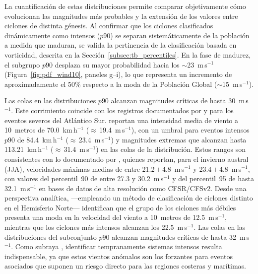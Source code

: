 La cuantificación de estas distribuciones permite comparar objetivamente cómo evolucionan las magnitudes más probables y la extensión de los valores entre ciclones de distinta génesis. 
Al confirmar que los ciclones clasificados dinámicamente como intensos ($p90$) se separan sistemáticamente de la población a medida que maduran, se valida la pertinencia de la clasificación basada en vorticidad, descrita en la Sección~\ref{subsec:tb_percentiles}. 
En la fase de madurez, el subgrupo $p90$ desplaza su mayor probabilidad hacia los $\sim$23~m\,s$^{-1}$ (Figura~\ref{fig:pdf_wind10}, paneles g--i), lo que representa un incremento de aproximadamente el 50\% respecto a la moda de la Población Global ($\sim$15~m\,s$^{-1}$).

Las colas en las distribuciones $p90$ alcanzan magnitudes críticas de hasta 30~m\,s$^{-1}$. Este corrimiento coincide con los registros documentados por \citet{padilhareinke2026characterization} y \citet{gramcianinov2020analysis} para los eventos severos del Atlántico Sur. 
\citet{padilhareinke2026characterization} reportan una intensidad media de viento a 10~metros de 70.0~km\,h$^{-1}$ (${\approx}$\,19.4~m\,s$^{-1}$), con un umbral para eventos intensos $p90$ de 84.4~km\,h$^{-1}$ (${\approx}$\,23.4~m\,s$^{-1}$) y magnitudes extremas que alcanzan hasta 113.21~km\,h$^{-1}$ (${\approx}$\,31.4~m\,s$^{-1}$) en las colas de la distribución. 
Estos rangos son consistentes con lo documentado por \citet{gramcianinov2020analysis}, quienes reportan, para el invierno austral (JJA), velocidades máximas medias de entre 21.2\,$\pm$\,4.8~m\,s$^{-1}$ y 23.4\,$\pm$\,4.8~m\,s$^{-1}$, con valores del percentil~90 de entre 27.3 y 30.2~m\,s$^{-1}$ y del percentil~95 de hasta 32.1~m\,s$^{-1}$ en bases de datos de alta resolución como CFSR/CFSv2. 
Desde una perspectiva analítica, \citet{corner2025classification} ---empleando un método de clasificación de ciclones distinto en el Hemisferio Norte--- identifican que el grupo de los ciclones más débiles presenta una moda en la velocidad del viento a 10~metros de 12.5~m\,s$^{-1}$, mientras que los ciclones más intensos alcanzan los 22.5~m\,s$^{-1}$. 
Las colas en las distribuciones del subconjunto $p90$ alcanzan magnitudes críticas de hasta 32~m\,s$^{-1}$.
Como subraya \citet{gramcianinov2023impact}, identificar tempranamente sistemas intensos resulta indispensable, ya que estos vientos anómalos son los forzantes para eventos asociados que suponen un riesgo directo para las regiones costeras y marítimas.


